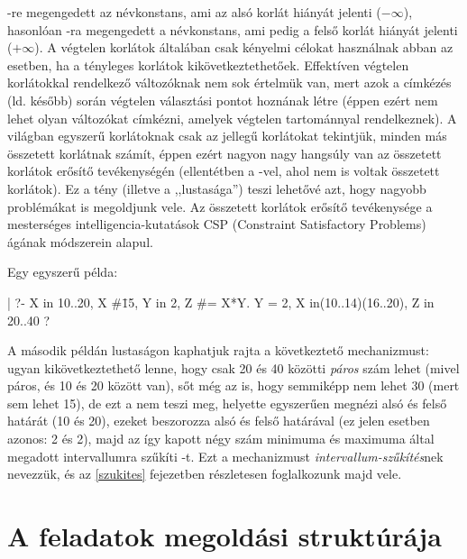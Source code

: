 -re megengedett az  névkonstans, ami az alsó korlát
hiányát jelenti ($-\infty$), hasonlóan -ra megengedett a 
névkonstans, ami pedig a felső korlát hiányát jelenti ($+\infty$). A végtelen
korlátok általában csak kényelmi célokat használnak abban az esetben, ha
a tényleges korlátok kikövetkeztethetőek. Effektíven végtelen korlátokkal
rendelkező változóknak nem sok értelmük van, mert azok a címkézés (ld. később)
során végtelen választási pontot hoznának létre (éppen ezért nem lehet olyan
változókat címkézni, amelyek végtelen tartománnyal rendelkeznek).
\br
A \clpfd világban egyszerű korlátoknak csak az 
jellegű korlátokat tekintjük, minden más összetett korlátnak számít, éppen
ezért nagyon nagy hangsúly van az összetett korlátok erősítő tevékenységén
(ellentétben a \Clpb -vel, ahol nem is voltak összetett korlátok). Ez a tény
(illetve a \clpfd ,,lustasága'') teszi lehetővé azt, hogy nagyobb problémákat
is megoldjunk vele. Az összetett korlátok erősítő tevékenysége a mesterséges
intelligencia-kutatások CSP (Constraint Satisfactory Problems) ágának
módszerein alapul.

Egy egyszerű \clpfd példa:

\begin{prologcode}
| ?- X in (10..20)/\ (\{15}), Y in 6..sup, Z #= X+Y.
X in(10..14)\/(16..20), Y in 6..sup, Z in 16..sup ?
\end{prologcode}

\begin{prologcode}
| ?- X in 10..20, X #\= 15, Y in {2}, Z #= X*Y.
   Y = 2, X in(10..14)\/(16..20), Z in 20..40 ?
\end{prologcode}

A második példán lustaságon kaphatjuk rajta a \clpfd következtető mechanizmust:
ugyan kikövetkeztethető lenne, hogy  csak 20 és 40 közötti \emph{páros}
szám lehet (mivel  páros, és  10 és 20 között van), sőt még
az is, hogy  semmiképp nem lehet 30 (mert  sem lehet 15),
de ezt a \clpfd nem teszi meg, helyette egyszerűen megnézi  alsó és
felső határát (10 és 20), ezeket beszorozza  alsó és felső határával
(ez jelen esetben azonos: 2 és 2), majd az így kapott négy szám minimuma és
maximuma által megadott intervallumra szűkíti -t. Ezt a mechanizmust
\emph{intervallum-szűkítés}nek nevezzük, és az \ref{szukites} fejezetben
részletesen foglalkozunk majd vele.

\section{A \clpfd feladatok megoldási struktúrája}

